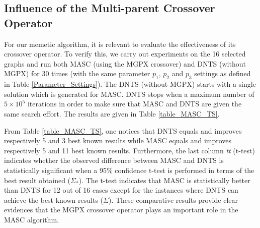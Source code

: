 \documentclass{elsart}
\begin{document}
\subsection{Influence of the Multi-parent Crossover Operator}
\label{subsec_sol_influence_Crossover}

For our memetic algorithm, it is relevant to evaluate the effectiveness of its crossover operator. To verify this, we carry out experiments on the 16 selected graphs and run both MASC (using the MGPX crossover) and DNTS (without MGPX) for 30 times (with the same parameter $p_1$, $p_2$ and $p_3$ settings as defined in Table \ref{Parameter_Settings}). The DNTS (without MGPX) starts with a single solution which is generated for MASC. DNTS stops when a maximum number of $5 \times 10^5$ iterations in order to make sure that MASC and DNTS are given the same search effort. The results are given in Table \ref{table_MASC_TS}. 

From Table \ref{table_MASC_TS}, one notices that DNTS equals and improves respectively 5 and 3 best known results while MASC equals and improves respectively 5 and 11 best known results. Furthermore, the last column \emph{tt} (t-test) indicates whether the observed difference between MASC and DNTS is statistically significant when a 95\% confidence t-test is performed in terms of the best result obtained ($\Sigma_*$). The t-test indicates that MASC is statistically better than DNTS for 12 out of 16 cases except for the instances where DNTS can achieve the best known results ($\Sigma$). These comparative results provide clear evidences that the MGPX crossover operator plays an important role in the MASC algorithm.
\end{document}
